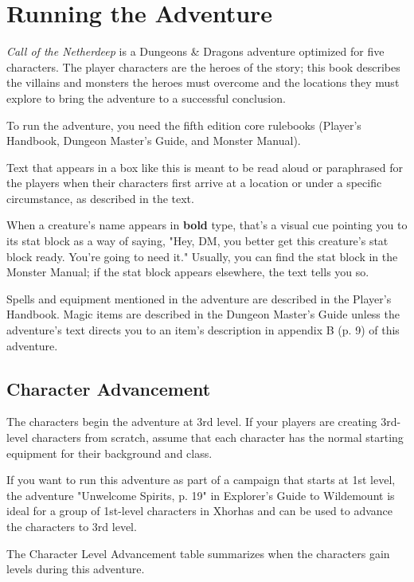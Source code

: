 \documentclass[a4paper, 11pt, bg=full, twocolumn, nooutline]{dndbook}
\begin{document}
\section{Running the Adventure}

\textit{Call of the Netherdeep} is a Dungeons \& Dragons adventure optimized for five characters. The player characters are the heroes of the story; this book describes the villains and monsters the heroes must overcome and the locations they must explore to bring the adventure to a successful conclusion.

To run the adventure, you need the fifth edition core rulebooks (Player's Handbook, Dungeon Master's Guide, and Monster Manual).

\begin{DndReadAloud}
Text that appears in a box like this is meant to be read aloud or paraphrased for the players when their characters first arrive at a location or under a specific circumstance, as described in the text.
\end{DndReadAloud}

When a creature's name appears in \textbf{bold} type, that's a visual cue pointing you to its stat block as a way of saying, "Hey, DM, you better get this creature's stat block ready. You're going to need it." Usually, you can find the stat block in the Monster Manual; if the stat block appears elsewhere, the text tells you so.

Spells and equipment mentioned in the adventure are described in the Player's Handbook. Magic items are described in the Dungeon Master's Guide unless the adventure's text directs you to an item's description in appendix B (p. 9) of this adventure.

\subsection{Character Advancement}

The characters begin the adventure at 3rd level. If your players are creating 3rd-level characters from scratch, assume that each character has the normal starting equipment for their background and class.

If you want to run this adventure as part of a campaign that starts at 1st level, the adventure "Unwelcome Spirits, p. 19" in Explorer's Guide to Wildemount is ideal for a group of 1st-level characters in Xhorhas and can be used to advance the characters to 3rd level.

The Character Level Advancement table summarizes when the characters gain levels during this adventure.
\end{document}
